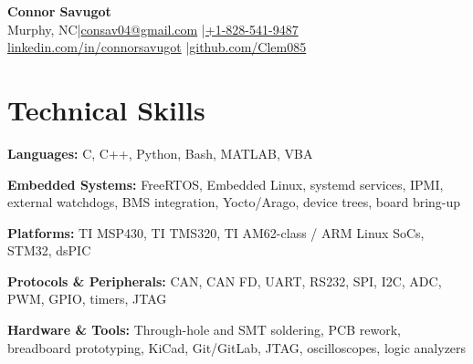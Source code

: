 \documentclass[10pt,letterpaper]{article}
\makeatletter
\newcommand{\mylocation}{Murphy, NC}
\newcommand{\myemail}{consav04@gmail.com}
\newcommand{\myphone}{+1-828-541-9487}
\newcommand{\mylinkedin}{connorsavugot}
\newcommand{\mygithub}{Clem085}
\makeatother
\begin{document}
\fontsize{8.5}{9.2}\selectfont

\begin{center}
  {\LARGE\textbf{Connor Savugot}}\\[2pt]
  {\small \mylocation \enspace|\enspace \href{mailto:\myemail}{\myemail} \enspace|\enspace \href{tel:\myphone}{\myphone} \\
  \href{https://linkedin.com/in/\mylinkedin}{linkedin.com/in/\mylinkedin} \enspace|\enspace \href{https://github.com/\mygithub}{github.com/\mygithub}}
\end{center}

\section{Technical Skills}
\begin{compactitem}
  \item \textbf{Languages:} C, C++, Python, Bash, MATLAB, VBA
  \item \textbf{Embedded Systems:} FreeRTOS, Embedded Linux, systemd services, IPMI, external watchdogs, BMS integration, Yocto/Arago, device trees, board bring-up
  \item \textbf{Platforms:} TI MSP430, TI TMS320, TI AM62-class / ARM Linux SoCs, STM32, dsPIC
  \item \textbf{Protocols \& Peripherals:} CAN, CAN FD, UART, RS232, SPI, I2C, ADC, PWM, GPIO, timers, JTAG
  \item \textbf{Hardware \& Tools:} Through-hole and SMT soldering, PCB rework, breadboard prototyping, KiCad, Git/GitLab, JTAG, oscilloscopes, logic analyzers
\end{compactitem}
\end{document}
